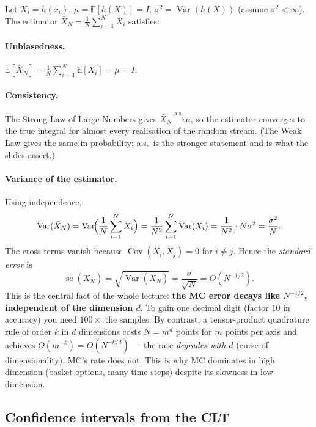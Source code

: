\documentclass[11pt]{article}
\newcommand{\E}{\mathbb{E}}
\newcommand{\Var}{\operatorname{Var}}
\newcommand{\Cov}{\operatorname{Cov}}
\begin{document}
Let $X_i=h(x_i)$, $\mu=\E[h(X)]=I$, $\sigma^2=\Var(h(X))$ (assume $\sigma^2<\infty$).
The estimator $\bar X_N=\frac1N\sum_{i=1}^N X_i$ satisfies:

\paragraph{Unbiasedness.} $\E[\bar X_N]=\frac1N\sum_{i=1}^N\E[X_i]=\mu=I$.

\paragraph{Consistency.} The Strong Law of Large Numbers gives
$\bar X_N\xrightarrow{\text{a.s.}}\mu$, so the estimator converges to the true integral
for almost every realisation of the random stream. (The Weak Law gives the same in
probability; a.s.\ is the stronger statement and is what the slides assert.)

\paragraph{Variance of the estimator.} Using independence,
\[
\Var(\bar X_N)=\Var\!\Bigl(\frac1N\sum_{i=1}^N X_i\Bigr)
=\frac{1}{N^2}\sum_{i=1}^N\Var(X_i)
=\frac{1}{N^2}\cdot N\sigma^2=\frac{\sigma^2}{N}.
\]
The cross terms vanish because $\Cov(X_i,X_j)=0$ for $i\ne j$. Hence the
\emph{standard error} is
\[
\operatorname{se}(\bar X_N)=\sqrt{\Var(\bar X_N)}=\frac{\sigma}{\sqrt N}=O(N^{-1/2}).
\]
This is the central fact of the whole lecture: \textbf{the MC error decays like
$N^{-1/2}$, independent of the dimension $d$}. To gain one decimal digit (factor $10$
in accuracy) you need $100\times$ the samples. By contrast, a tensor-product quadrature
rule of order $k$ in $d$ dimensions costs $N=m^d$ points for $m$ points per axis and
achieves $O(m^{-k})=O(N^{-k/d})$ --- the rate \emph{degrades with $d$} (curse of
dimensionality). MC's rate does not. This is why MC dominates in high dimension (basket
options, many time steps) despite its slowness in low dimension.

\subsection{Confidence intervals from the CLT}
\end{document}
